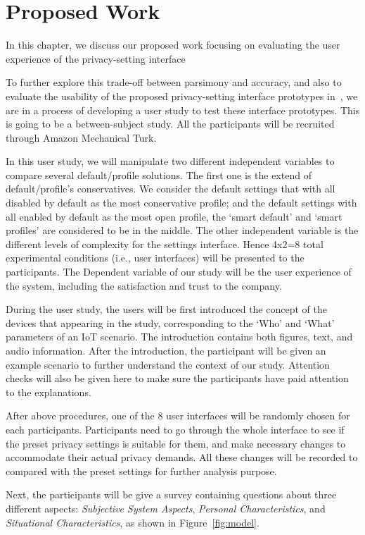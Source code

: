 \chapter{Proposed Work}
In this chapter, we discuss our proposed work focusing on evaluating the user experience of the privacy-setting interface

To further explore this trade-off between parsimony and accuracy, and also to evaluate the usability of the proposed privacy-setting interface prototypes in~\cite{he2018data}, we are in a process of developing a user study to test these interface prototypes. This is going to be a between-subject study. All the participants will be recruited through Amazon Mechanical Turk. 

In this user study, we will manipulate two different independent variables to compare several default/profile solutions. The first one is the extend of default/profile's conservatives. We consider the default settings that with all disabled by default as the most conservative profile; and the default settings with all enabled by default as the most open profile, the `smart default' and `smart profiles' are considered to be in the middle. The other independent variable is the different levels of complexity for the settings interface. Hence 4x2=8 total experimental conditions (i.e., user interfaces) will be presented to the participants. The Dependent variable of our study will be the user experience of the system, including the satisfaction and trust to the company.

During the user study, the users will be first introduced the concept of the devices that appearing in the study, corresponding to the `Who' and `What' parameters of an IoT scenario. The introduction contains both figures, text, and audio information. After the introduction, the participant will be given an example scenario to further understand the context of our study. Attention checks will also be given here to make sure the participants have paid attention to the explanations.

After above procedures, one of the 8 user interfaces will be randomly chosen for each participants. Participants need to go through the whole interface to see if the preset privacy settings is suitable for them, and make necessary changes to accommodate their actual privacy demands. All these changes will be recorded to compared with the preset settings for further analysis purpose.

Next, the participants will be give a survey containing questions about three different aspects: \textit{Subjective System Aspects}, \textit{Personal Characteristics}, and \textit{Situational Characteristics}, as shown in Figure~\ref{fig:model}.

